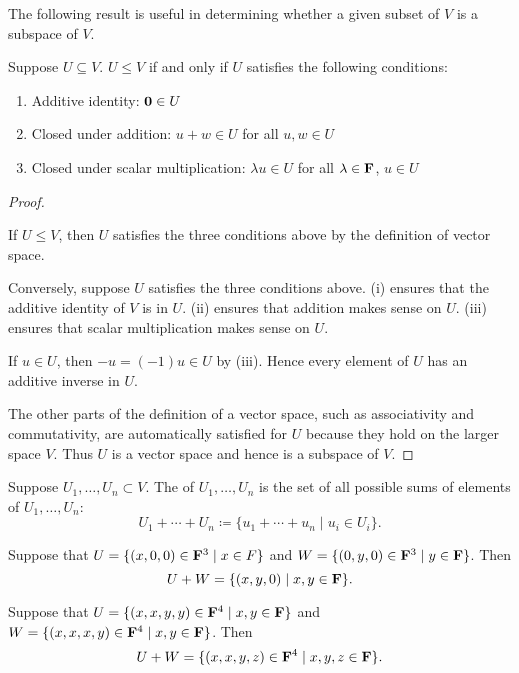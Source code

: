 The following result is useful in determining whether a given subset of $V$ is a subspace of $V$.

\begin{lemma}\label{lemma:subspace-conditions}
Suppose $U\subseteq V$. $U\le V$ if and only if $U$ satisfies the following conditions:
\begin{enumerate}[label=(\roman*)]
\item Additive identity: $\vb{0}\in U$
\item Closed under addition: $u+w\in U$ for all $u,w\in U$
\item Closed under scalar multiplication: $\lambda u\in U$ for all $\lambda\in\mathbf F$, $u\in U$
\end{enumerate}
\end{lemma}

\begin{proof} \

\fbox{$\implies$} If $U\le V$, then $U$ satisfies the three conditions above by the definition of vector space.

\fbox{$\impliedby$} Conversely, suppose $U$ satisfies the three conditions above. (i) ensures that the additive identity of $V$ is in $U$. (ii) ensures that addition makes sense on $U$. (iii) ensures that scalar multiplication makes sense on $U$.

If $u\in U$, then $-u=(-1)u\in U$ by (iii). Hence every element of $U$ has an additive inverse in $U$.

The other parts of the definition of a vector space, such as associativity and commutativity, are automatically satisfied for $U$ because they hold on the larger space $V$. Thus $U$ is a vector space and hence is a subspace of $V$.
\end{proof}

\begin{definition}
Suppose $U_1,\dots,U_n\subset V$. The  of $U_1,\dots,U_n$ is the set of all possible sums of elements of $U_1,\dots,U_n$:
\[U_1+\cdots+U_n\coloneqq\{u_1+\cdots+u_n\mid u_i\in U_i\}.\]
\end{definition}

\begin{example}
Suppose that $U=\{(x,0,0)\in\mathbf F^3\mid x\in F\}$ and $W=\{(0,y,0)\in\mathbf F^3\mid y\in\mathbf F\}$. Then
\[U+W=\{(x,y,0)\mid x,y\in\mathbf F\}.\]
\end{example}

\begin{example}
Suppose that $U=\{(x,x,y,y)\in\mathbf F^4\mid x,y\in\mathbf F\}$ and $W=\{(x,x,x,y)\in\mathbf F^4\mid x,y\in\mathbf F\}$. Then
\[U+W=\{(x,x,y,z)\in\mathbf F^4\mid x,y,z\in\mathbf F\}.\]
\end{example}

